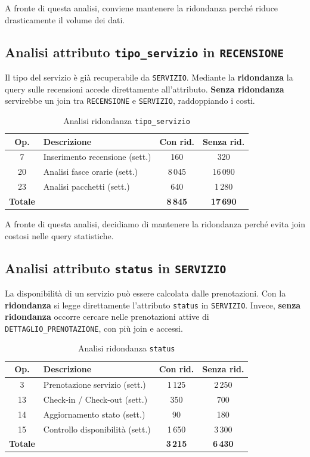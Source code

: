 \documentclass[a4paper,12pt]{report}
\begin{document}
\noindent
A fronte di questa analisi, conviene mantenere la ridondanza perché riduce drasticamente il volume dei dati.

\subsection{Analisi attributo \texttt{tipo\_servizio} in \texttt{RECENSIONE}}
Il tipo del servizio è già recuperabile da \texttt{SERVIZIO}.  
Mediante la \textbf{ridondanza} la query sulle recensioni accede direttamente all’attributo.
\textbf{Senza ridondanza} servirebbe un join tra \texttt{RECENSIONE} e \texttt{SERVIZIO}, raddoppiando i costi.

\begin{table}[H]
\centering
\small
\begin{tabular}{|c|l|c|c|}
\hline
\rowcolor{gray!20}
\textbf{Op.} & \textbf{Descrizione} & \textbf{Con rid.} & \textbf{Senza rid.} \\
\hline
7 & Inserimento recensione (sett.) & 160 & 320 \\
20 & Analisi fasce orarie (sett.) & 8\,045 & 16\,090 \\
23 & Analisi pacchetti (sett.) & 640 & 1\,280 \\
\hline
\textbf{Totale} & & \textbf{8\,845} & \textbf{17\,690} \\
\hline
\end{tabular}
\caption{Analisi ridondanza \texttt{tipo\_servizio}}
\end{table}

\noindent
A fronte di questa analisi, decidiamo di mantenere la ridondanza perché evita join costosi nelle query statistiche.

\subsection{Analisi attributo \texttt{status} in \texttt{SERVIZIO}}
La disponibilità di un servizio può essere calcolata dalle prenotazioni.  
Con la \textbf{ridondanza} si legge direttamente l’attributo \texttt{status} in \texttt{SERVIZIO}.
Invece, \textbf{senza ridondanza} occorre cercare nelle prenotazioni attive di \texttt{DETTAGLIO\_PRENOTAZIONE}, con più join e accessi.

\begin{table}[H]
\centering
\small
\begin{tabular}{|c|l|c|c|}
\hline
\rowcolor{gray!20}
\textbf{Op.} & \textbf{Descrizione} & \textbf{Con rid.} & \textbf{Senza rid.} \\
\hline
3 & Prenotazione servizio (sett.) & 1\,125 & 2\,250 \\
13 & Check-in / Check-out (sett.) & 350 & 700 \\
14 & Aggiornamento stato (sett.) & 90 & 180 \\
15 & Controllo disponibilità (sett.) & 1\,650 & 3\,300 \\
\hline
\textbf{Totale} & & \textbf{3\,215} & \textbf{6\,430} \\
\hline
\end{tabular}
\caption{Analisi ridondanza \texttt{status}}
\end{table}
\end{document}
